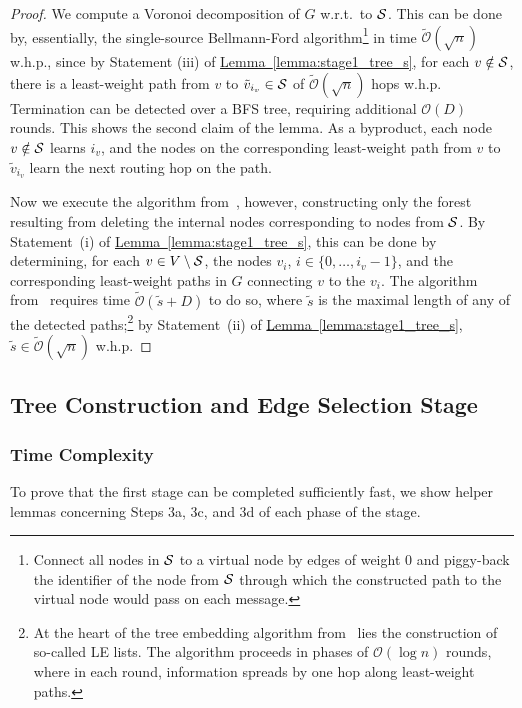 \documentclass[letterpaper,11pt]{article}
\newcommand{\namedref}[2]{\hyperref[#2]{#1~\ref*{#2}}}
\newcommand{\lemmaref}[1]{\namedref{Lemma}{#1}}
\newcommand{\BO}{\mathcal{O}}
\begin{document}
\begin{proof}
We compute a Voronoi decomposition of $G$ w.r.t.\ to ${\cal S}$. This can be
done by, essentially, the single-source Bellmann-Ford algorithm\footnote{Connect
all nodes in ${\cal S}$ to a virtual node by edges of weight $0$ and piggy-back
the identifier of the node from ${\cal S}$ through which the constructed path to
the virtual node would pass on each message.} in time $\tilde{\BO}(\sqrt{n})$
w.h.p., since by Statement (iii) of \lemmaref{lemma:stage1_tree_s}, for each
$v\notin {\cal S}$, there is a least-weight path from $v$ to $\tilde{v}_{i_v}\in
{\cal S}$ of $\tilde{\BO}(\sqrt{n})$ hops w.h.p. Termination can be detected
over a BFS tree, requiring additional $\BO(D)$ rounds. This shows the second
claim of the lemma. As a byproduct, each node $v\notin {\cal S}$ learns $i_v$,
and the nodes on the corresponding least-weight path from $v$ to
$\tilde{v}_{i_v}$ learn the next routing hop on the path.

Now we execute the algorithm from~\cite{KKMPT-12}, however, constructing only
the forest resulting from deleting the internal nodes corresponding to nodes
from ${\cal S}$. By Statement~(i) of \lemmaref{lemma:stage1_tree_s}, this can be
done by determining, for each $v\in V\setminus {\cal S}$, the nodes $v_i$,
$i\in \{0,\ldots,i_v-1\}$, and the corresponding least-weight paths in $G$
connecting $v$ to the $v_i$. The algorithm from~\cite{KKMPT-12} requires time
$\tilde{\BO}(\tilde{s}+D)$ to do so, where $\tilde{s}$ is the maximal length of
any of the detected paths;\footnote{At the heart of the tree embedding algorithm
from~\cite{KKMPT-12} lies the construction of so-called LE lists. The algorithm
proceeds in phases of $\BO(\log n)$ rounds, where in each round, information
spreads by one hop along least-weight paths.} by Statement~(ii) of
\lemmaref{lemma:stage1_tree_s}, $\tilde{s}\in \tilde{\BO}(\sqrt{n})$ w.h.p.
\end{proof}


\subsection{Tree Construction and Edge Selection
Stage}\label{sec:tree_selection}

\subsubsection*{Time Complexity}

To prove that the first stage can be completed sufficiently fast, we show
helper lemmas concerning Steps 3a, 3c, and 3d of each phase of the stage.
\end{document}
